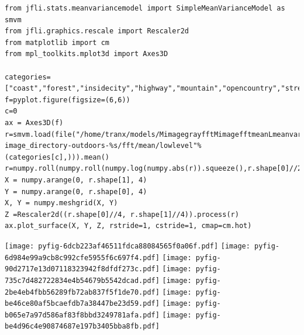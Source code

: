 \documentclass{report}
\begin{document}
\begin{lstlisting}
from jfli.stats.meanvariancemodel import SimpleMeanVarianceModel as smvm
from jfli.graphics.rescale import Rescaler2d
from matplotlib import cm
from mpl_toolkits.mplot3d import Axes3D

categories=["coast","forest","insidecity","highway","mountain","opencountry","street","tallbuilding"]
f=pyplot.figure(figsize=(6,6))
c=0
ax = Axes3D(f)
r=smvm.load(file("/home/tranx/models/MimagegrayfftMimagefftmeanLmeanvariancemodelSimpleMeanVarianceModel-image_directory-outdoors-%s/fft/mean/lowlevel"%(categories[c],))).mean()
r=numpy.roll(numpy.roll(numpy.log(numpy.abs(r)).squeeze(),r.shape[0]//2,axis=0),r.shape[0]//2,axis=1).squeeze()
X = numpy.arange(0, r.shape[1], 4)
Y = numpy.arange(0, r.shape[0], 4)
X, Y = numpy.meshgrid(X, Y)
Z =Rescaler2d((r.shape[0]//4, r.shape[1]//4)).process(r)
ax.plot_surface(X, Y, Z, rstride=1, cstride=1, cmap=cm.hot)

\end{lstlisting}











\noindent \texttt{[image: pyfig-6dcb223af46511fdca88084565f0a06f.pdf]}            \noindent \texttt{[image: pyfig-6d984e99a9cb8c992cfe5955f6c697f4.pdf]}            \noindent \texttt{[image: pyfig-90d2717e13d07118323942f8dfdf273c.pdf]}            \noindent \texttt{[image: pyfig-735c7d482722834e4b54679b5542dcad.pdf]}             \noindent \texttt{[image: pyfig-2be4eb4fbb56289fb72ab837f5f1de70.pdf]}            \noindent \texttt{[image: pyfig-be46ce80af5bcaefdb7a38447be23d59.pdf]}            \noindent \texttt{[image: pyfig-b065e7a97d586af83f8bbd3249781afa.pdf]}            \noindent \texttt{[image: pyfig-be4d96c4e90874687e197b3405bba8fb.pdf]} 
\end{document}
